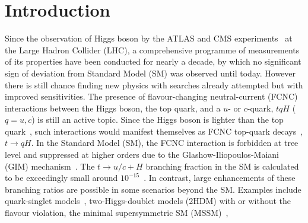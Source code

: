 \section{Introduction}
\label{sec:intro}

Since the observation of Higgs boson by the ATLAS and CMS experiments~\cite{Aad:2012tfa,Chatrchyan:2012ufa} at
the Large Hadron Collider (LHC), a comprehensive programme of measurements of its properties have been conducted for nearly a decade, by which no significant sign of deviation from Standard Model (SM) was observed until today. However there is still chance finding new physics with searches already attempted but with improved sensitivities. The presence of flavour-changing neutral-current (FCNC) interactions 
between the Higgs boson, the top quark, and a $u$- or $c$-quark, $tqH$ ($q=u,c$) is still an active topic. Since the Higgs boson is lighter than the top quark~\cite{Aad:2015zhl},
such interactions would manifest themselves as FCNC top-quark decays~\cite{Agashe:2013hma}, $t\to qH$.  
In the Standard Model (SM), the FCNC interaction is forbidden at tree level and suppressed at higher orders due to the Glashow-Iliopoulos-Maiani (GIM) mechanism~\cite{Glashow:1970gm}. The $t\to u/c+H$ branching fraction in the SM is calculated to be exceedingly small around $10^{-15}$~\cite{Eilam:1990zc,Mele:1998ag,AguilarSaavedra:2004wm,Zhang:2013xya}. 
In contrast, large enhancements of these branching ratios are possible in some scenarios beyond the SM.
Examples include quark-singlet models~\cite{AguilarSaavedra:2002kr}, two-Higgs-doublet models (2HDM) with or without the flavour violation,
the minimal supersymmetric SM (MSSM)~\cite{Bejar:2000ub, Guasch:1999jp,Cao:2007dk,Cao:2014udj},
